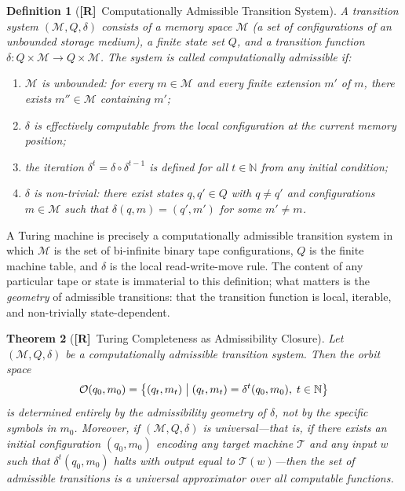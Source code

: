 \documentclass[11pt, oneside]{article}
\numberwithin{equation}{section}
\newcommand{\ClaimR}{\textcolor{rsvpblue}{\textbf{[R]}}}
\theoremstyle{rsvpstyle}
\newtheorem{theorem}{Theorem}[section]
\newtheorem{definition}[theorem]{Definition}
\theoremstyle{remark}
\begin{document}
\begin{definition}[\ClaimR\ Computationally Admissible Transition System]
\label{def:comp-adm}
A transition system $(\mathcal{M}, Q, \delta)$ consists of a memory space
$\mathcal{M}$ (a set of configurations of an unbounded storage medium), a finite
state set $Q$, and a transition function $\delta : Q \times \mathcal{M} \to Q
\times \mathcal{M}$. The system is called \emph{computationally admissible} if:
\begin{enumerate}[label=(\roman*)]
  \item $\mathcal{M}$ is unbounded: for every $m \in \mathcal{M}$ and every finite
    extension $m'$ of $m$, there exists $m'' \in \mathcal{M}$ containing $m'$;
  \item $\delta$ is effectively computable from the local configuration at the current
    memory position;
  \item the iteration $\delta^t = \delta \circ \delta^{t-1}$ is defined for all
    $t \in \mathbb{N}$ from any initial condition;
  \item $\delta$ is non-trivial: there exist states $q, q' \in Q$ with $q \neq q'$
    and configurations $m \in \mathcal{M}$ such that $\delta(q, m) = (q', m')$
    for some $m' \neq m$.
\end{enumerate}
\end{definition}

A Turing machine is precisely a computationally admissible transition system in which
$\mathcal{M}$ is the set of bi-infinite binary tape configurations, $Q$ is the finite
machine table, and $\delta$ is the local read-write-move rule. The content of any
particular tape or state is immaterial to this definition; what matters is the
\emph{geometry} of admissible transitions: that the transition function is local,
iterable, and non-trivially state-dependent.

\begin{theorem}[\ClaimR\ Turing Completeness as Admissibility Closure]
\label{thm:turing-adm}
Let $(\mathcal{M}, Q, \delta)$ be a computationally admissible transition system. Then
the orbit space
\begin{equation}
  \mathcal{O}(q_0, m_0) = \bigl\{ (q_t, m_t) \bigm| (q_t, m_t) = \delta^t(q_0, m_0),\; t \in \mathbb{N} \bigr\}
\end{equation}
is determined entirely by the admissibility geometry of $\delta$, not by the specific
symbols in $m_0$. Moreover, if $(\mathcal{M}, Q, \delta)$ is universal---that is, if
there exists an initial configuration $(q_0, m_0)$ encoding any target machine
$\mathcal{T}$ and any input $w$ such that $\delta^t(q_0, m_0)$ halts with output
equal to $\mathcal{T}(w)$---then the set of admissible transitions is a universal
approximator over all computable functions.
\end{theorem}
\end{document}
